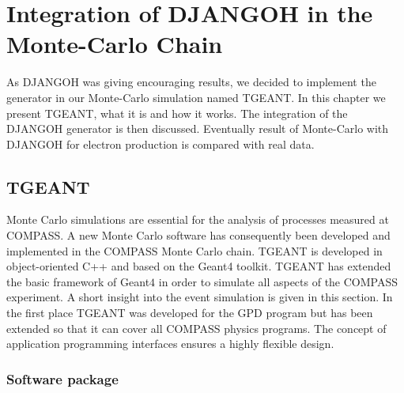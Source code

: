 
\chapter{Integration of DJANGOH in the Monte-Carlo Chain} %

\label{ch:MC} %


As DJANGOH was giving encouraging results, we decided to implement the generator in our Monte-Carlo simulation named TGEANT. In this chapter we present TGEANT, what it is and how it works. The integration of the DJANGOH generator is then discussed. Eventually result of Monte-Carlo with DJANGOH for electron production is compared with real data.

\section{TGEANT}

Monte Carlo simulations are essential for the analysis of processes measured at COMPASS. A new Monte Carlo software has consequently been developed and implemented in the COMPASS Monte Carlo chain. TGEANT \cite{Tobias} is developed in object-oriented C++ and based on the Geant4 toolkit. TGEANT has extended the basic framework of Geant$4$ in order to simulate all aspects of the COMPASS experiment. A short insight into the event simulation is given in this section.
In the first place TGEANT was developed for the GPD program but has been extended so that it can cover all COMPASS physics programs. The concept of application programming interfaces ensures a highly flexible design.

\subsection{Software package}

